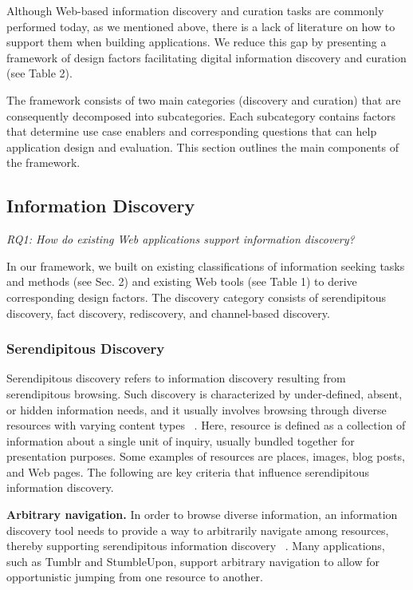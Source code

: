 \documentclass{casconpaper}
\begin{document}
{{Although Web-based information discovery and curation tasks are commonly performed today, as we mentioned above, there is a lack of literature on how to support them when building applications. We reduce this gap by presenting a framework of design factors facilitating digital information discovery and curation (see Table 2). 

The framework consists of two main categories (discovery and curation) that are consequently decomposed into subcategories. Each subcategory contains factors that determine use case enablers and corresponding questions that can help application design and evaluation. This section outlines the main components of the framework.

} %

{\subsection{Information Discovery}

\emph{RQ1: How do existing Web applications support information discovery?}

In our framework, we built on existing classifications of information seeking tasks and methods (see Sec. 2) and existing Web tools (see Table 1) to derive corresponding design factors. The discovery category consists of serendipitous discovery, fact discovery, rediscovery, and channel-based discovery. 
} %

{\subsubsection{Serendipitous Discovery}
Serendipitous discovery refers to information discovery resulting from serendipitous browsing. Such discovery is characterized by under-defined, absent, or hidden information needs, and it usually involves browsing through diverse resources with varying content types ~\cite{kellar2006, kellar2007}. Here, resource is defined as a collection of information about a single unit of inquiry, usually bundled together for presentation purposes. Some examples of resources are places, images, blog posts, and Web pages. The following are key criteria that influence serendipitous information discovery.

\textbf{Arbitrary navigation.} In order to browse diverse information, an information discovery tool needs to provide a way to arbitrarily navigate among resources, thereby supporting serendipitous information discovery ~\cite{foster}. Many applications, such as Tumblr and StumbleUpon, support arbitrary navigation to allow for opportunistic jumping from one resource to another. 

}}
\end{document}
